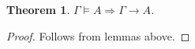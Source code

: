 \documentclass[a4paper]{article}
\theoremstyle{defin}
\newtheorem{defin}{Definition}
\theoremstyle{theorem}
\newtheorem{theorem}{Theorem}
\theoremstyle{prop}
\theoremstyle{lemma}
\theoremstyle{ex}
\theoremstyle{col}
\begin{document}
\begin{theorem}
  $\Gamma \models A \Rightarrow \Gamma \rightarrow A$.
\end{theorem}

\begin{proof}
  Follows from lemmas above.
\end{proof}

\begin{comment}

\section{Categorical part}

\begin{defin} Monoidal comonad
  $ $

  A monoidal comonad on some monoidal category $\mathcal{C}$ is a triple $\langle \mathcal{F}, \epsilon, \delta \rangle$,
  where $\mathcal{F}$ is a monoidal endofunctor and $\epsilon : \mathcal{F} \Rightarrow Id_{\mathcal{C}}$ (counit) and $\epsilon : \mathcal{F} \Rightarrow \mathcal{F}^2$ (comultiplication),
  such that the following diagrams commute:

\begin{minipage}{0.45\textwidth}
\begin{small}
\xymatrix{
\mathcal{F}A \otimes \mathcal{F}B \ar[dd]_{\delta_A \otimes \delta_B} \ar[r]^{\phi_{A,B}} & \mathcal{F}(A \otimes B) \ar[dr]^{\delta_{A \otimes B}} \\
&& \mathcal{F}\mathcal{F}(A \otimes B) \\
\mathcal{F}\mathcal{F}A \otimes \mathcal{F}\mathcal{F}B \ar[r]_{\phi_{\mathcal{F}A, \mathcal{F}B}} & \mathcal{F}(\mathcal{F}A \otimes \mathcal{F}B) \ar[ur]_{\mathcal{F}(\phi_{A,B})}
}
\end{small}
\end{minipage}%
\hfill
\begin{minipage}{0.5\textwidth}
\begin{tabular}{p{\textwidth}}
\xymatrix{
\mathcal{F}A \otimes \mathcal{F}B \ar[rr]^{\phi_{A,B}} \ar[dr]_{\epsilon_A \otimes \epsilon_B} && \mathcal{F}(A \otimes B) \ar[dl]^{\epsilon_{A \otimes B}} \\
& A \otimes B &
}
\end{tabular}
\end{minipage}%

\xymatrix{
&&&&&&& \mathds{1} \ar[r]^{\phi} \ar[d]_{\phi} & \mathcal{F}\mathds{1} \ar[d]^{\delta_{\mathds{1}}} \\
&&&&&&& \mathcal{F}\mathds{1} \ar[r]_{\mathcal{F}(\phi)} & \mathcal{F}\mathcal{F}\mathds{1}
}


\end{comment}
\end{document}

